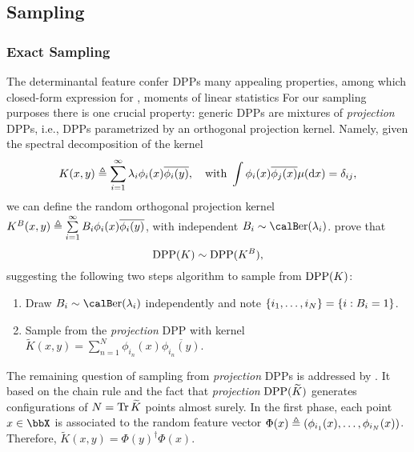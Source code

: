 \documentclass[twoside,11pt]{article}
\begin{document}
  \subsection{Sampling} %
  \label{sub:sampling}

    \subsubsection{Exact Sampling} %
    \label{ssub:exact_sampling}

      The determinantal feature confer DPPs many appealing properties, among which closed-form expression for , moments of linear statistics \etc
      For our sampling purposes there is one crucial property: generic DPPs are mixtures of \textit{projection} DPPs, i.e., DPPs parametrized by an orthogonal projection kernel.
      Namely, given the spectral decomposition of the kernel
      \begin{equation}
      \label{eq:eigdec_kernel}
        K(x,y)\triangleq\sum\limits_{i=1}^{\infty} \lambda_i \phi_i(x) \overline{\phi_i(y)},
        \quad \text{with }
        \int \phi_i(x) \overline{\phi_j(x)} \mu(\mathop{}\!\mathrm{d} x) = \delta_{ij},
      \end{equation}
\noindent
      we can define the random orthogonal projection kernel
      $
        K^B(x,y)
          \triangleq \sum\limits_{i=1}^{\infty} B_i \phi_i(x) \overline{\phi_i(y)}
      $, with independent $B_i\sim\Ber(\lambda_i)$.
      \citet[Theorem 7]{HKPV06} prove that
      \begin{equation}
        \operatorname{DPP}(K) \sim \operatorname{DPP}(K^B),
      \end{equation}
      suggesting the following two steps algorithm to sample from $\operatorname{DPP}(K)$:
      \begin{enumerate}
        \item Draw $B_i\sim\Ber(\lambda_i)$ independently and note $\left\{ i_1,\dots,i_{N} \right\} = \left\{ i:B_i=1 \right\}$.
        \item Sample from the \textit{projection} DPP with kernel $\tilde{K}(x,y) = \sum_{n=1}^{N}\phi_{i_n}(x) \overline{\phi_{i_n}(y)}$.
      \end{enumerate}
\noindent
      The remaining question of sampling from \textit{projection} DPPs is addressed by \citet[Algorithm 18]{HKPV06}.
      It based on the chain rule and the fact that \textit{projection} $\operatorname{DPP}(\widetilde{K})$ generates configurations of $N=\operatorname{Tr} \widetilde{K}$ points almost surely.
      In the first phase, each point $x\in \bbX$ is associated to the random feature vector $\Phi(x) \triangleq \left( \phi_{i_1}(x),\dots,\phi_{i_N}(x) \right)$. Therefore, $\tilde{K}(x,y) = \Phi(y)^{\dagger} \Phi(x)$.
\end{document}
